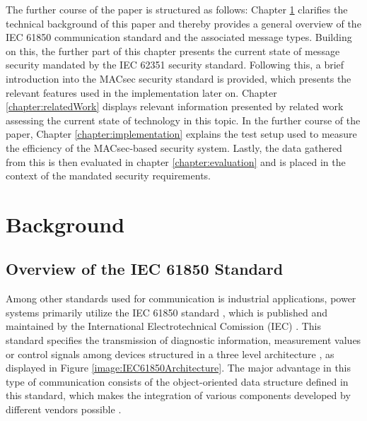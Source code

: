 \documentclass[conference, onecolumn, a4paper]{IEEEtran}
\begin{document}
\smallskip
The further course of the paper is structured as follows: Chapter \ref{chapter:fundamentals} clarifies the technical background of this paper and thereby 
provides a general overview of the IEC 61850 communication standard and the associated  message types. Building on this, the further part of this chapter 
presents the current state of message security mandated by the IEC 62351 security standard. Following this, a brief introduction into the MACsec security 
standard is provided, which presents the relevant features used in the implementation later on. Chapter \ref{chapter:relatedWork} displays relevant 
information presented by related work assessing the current state of technology in this topic. In the further course of the paper, Chapter 
\ref{chapter:implementation} explains the test setup used to measure the efficiency of the MACsec-based security system. Lastly, the data gathered from 
this is then evaluated in chapter \ref{chapter:evaluation} and is placed in the context of the mandated security requirements. 

\section{Background}
\label{chapter:fundamentals}

\subsection{Overview of the IEC 61850 Standard}
\label{subchapter:IEC61850}
Among other standards used for communication is industrial applications, power systems primarily utilize the IEC 61850 standard \cite{IEC61850:2023}, 
which is published and maintained by the International Electrotechnical Comission (IEC) \cite{IEC61850_Overview:2006}. This standard specifies the 
transmission of diagnostic information, measurement values or control signals among devices structured in a three level architecture 
\cite{SGRWin_IEC61850Architecture:2021}, as displayed in Figure \ref{image:IEC61850Architecture}. The major advantage in this type of communication consists 
of the object-oriented data structure defined in this standard, which makes the integration of various components developed by different vendors possible 
\cite[p. 5643]{Review_IEC62351:2019}. 
\end{document}
